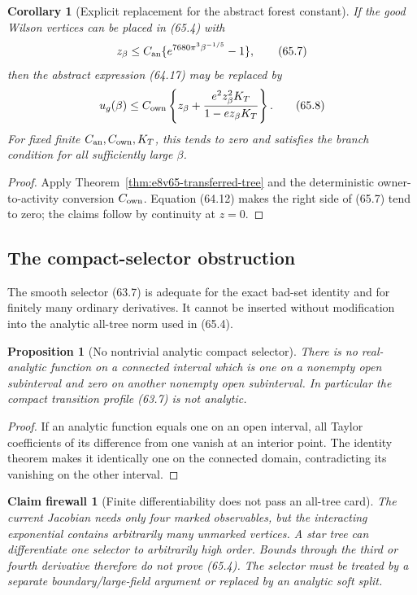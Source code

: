 \documentclass[11pt,oneside]{book}
\newtheorem{proposition}[theorem]{Proposition}
\newtheorem{corollary}[theorem]{Corollary}
\newtheorem{firewall}[theorem]{Claim firewall}
\theoremstyle{definition}
\theoremstyle{remark}
\begin{document}
\begin{corollary}[Explicit replacement for the abstract forest
constant]
\label{cor:e8v65-forest-replacement}
If the good Wilson vertices can be placed in (65.4) with
\[
 z_\beta\le C_{\rm an}
 \{e^{7680\pi^3\beta^{-1/5}}-1\},                            \tag{65.7}
\]
then the abstract expression (64.17) may be replaced by
\[
 u_g(\beta)\le C_{\rm own}\left\{
 z_\beta+\frac{e^2z_\beta^2K_T}{1-ez_\beta K_T}
 \right\}.                                                   \tag{65.8}
\]
For fixed finite \(C_{\rm an},C_{\rm own},K_T\), this tends to
zero and satisfies the branch condition for all sufficiently large
\(\beta\).
\end{corollary}

\begin{proof}
Apply Theorem~\ref{thm:e8v65-transferred-tree} and the deterministic
owner-to-activity conversion \(C_{\rm own}\).  Equation (64.12)
makes the right side of (65.7) tend to zero; the claims follow by
continuity at \(z=0\).
\end{proof}

\subsection{The compact-selector obstruction}

The smooth selector (63.7) is adequate for the exact bad-set
identity and for finitely many ordinary derivatives.  It cannot be
inserted without modification into the analytic all-tree norm used
in (65.4).

\begin{proposition}[No nontrivial analytic compact selector]
\label{prop:e8v65-no-analytic-cutoff}
There is no real-analytic function on a connected interval which is
one on a nonempty open subinterval and zero on another nonempty open
subinterval.  In particular the compact transition profile (63.7)
is not analytic.
\end{proposition}

\begin{proof}
If an analytic function equals one on an open interval, all Taylor
coefficients of its difference from one vanish at an interior point.
The identity theorem makes it identically one on the connected
domain, contradicting its vanishing on the other interval.
\end{proof}

\begin{firewall}[Finite differentiability does not pass an all-tree
card]
\label{fire:e8v65-selector-forest}
The current Jacobian needs only four marked observables, but the
interacting exponential contains arbitrarily many unmarked
vertices.  A star tree can differentiate one selector to arbitrarily
high order.  Bounds through the third or fourth derivative therefore
do not prove (65.4).  The selector must be treated by a separate
boundary/large-field argument or replaced by an analytic soft split.
\end{firewall}
\end{document}
